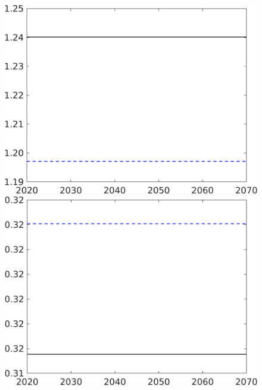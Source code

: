 \begin{figure}[h!!]
\begin{minipage}[]{0.32\textwidth}
	\end{minipage}
	\begin{minipage}[]{0.32\textwidth}
		\includegraphics[width=1\textwidth]{../../codding_model/own_basedOnFried/optimalPol_190722_tidiedUp/figures/all_10Aout22/CountTaul_modxgr_nsk_target_pg_spillover0_sep1_extern0_PV1_etaa0.79_lgd0.png}
	\end{minipage}
	\begin{minipage}[]{0.32\textwidth}
		\includegraphics[width=1\textwidth]{../../codding_model/own_basedOnFried/optimalPol_190722_tidiedUp/figures/all_10Aout22/CountTaul_modxgr_nsk_target_pf_spillover0_sep1_extern0_PV1_etaa0.79_lgd0.png}

\end{minipage}
\end{figure}
